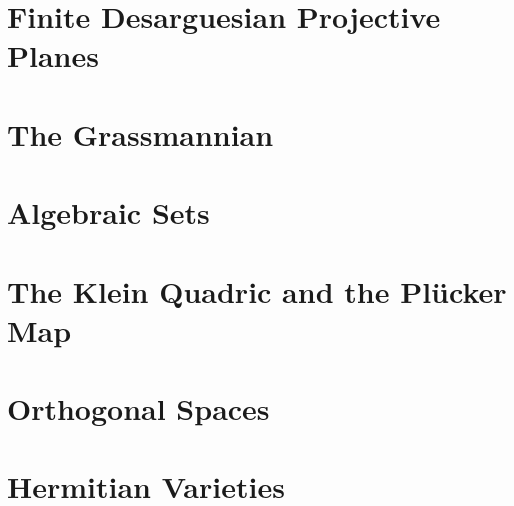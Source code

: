\bigskip

\clearpage




\section{Finite Desarguesian Projective Planes}
\label{sec:finite:desarguesian:planes}






\bigskip

\clearpage


\section{The Grassmannian}
\label{sec:grassmannian}






\bigskip

\clearpage


\section{Algebraic Sets}
\label{sec:algebraicsets}








\clearpage


\section{The Klein Quadric and the Pl\"ucker Map}
\label{sec:klein}






\bigskip

\clearpage


\section{Orthogonal Spaces}
\label{sec:orthogonal}






\bigskip

\clearpage


\section{Hermitian Varieties}
\label{sec:hermitian}


